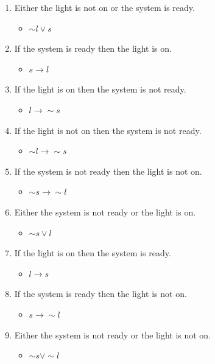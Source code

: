 \documentclass[12pt,a4paper]{article}
\begin{document}
\begin{enumerate}
\item Either the light is not on or the system is ready.
	\begin{itemize}
	\item $\sim{l} \vee s$
	\end{itemize}
\item If the system is ready then the light is on.
	\begin{itemize}
	\item $s \rightarrow l$
	\end{itemize}
\item If the light is on then the system is not ready.
	\begin{itemize}
	\item $l \rightarrow \sim{s}$
	\end{itemize}
\item If the light is not on then the system is not ready.
	\begin{itemize}
	\item $\sim{l} \rightarrow \sim{s}$
	\end{itemize}
\item If the system is not ready then the light is not on.
	\begin{itemize}
	\item $\sim{s} \rightarrow \sim{l}$
	\end{itemize}
\item Either the system is not ready or the light is on.
	\begin{itemize}
	\item $\sim{s} \vee l$
	\end{itemize}
\item If the light is on then the system is ready.
	\begin{itemize}
	\item $l \rightarrow s$
	\end{itemize}
\item If the system is ready then the light is not on.
	\begin{itemize}
	\item $s \rightarrow \sim{l}$
	\end{itemize}
\item Either the system is not ready or the light is not on.
	\begin{itemize}
	\item $\sim{s} \vee \sim{l}$
	\end{itemize}
\end{enumerate}
\end{document}
